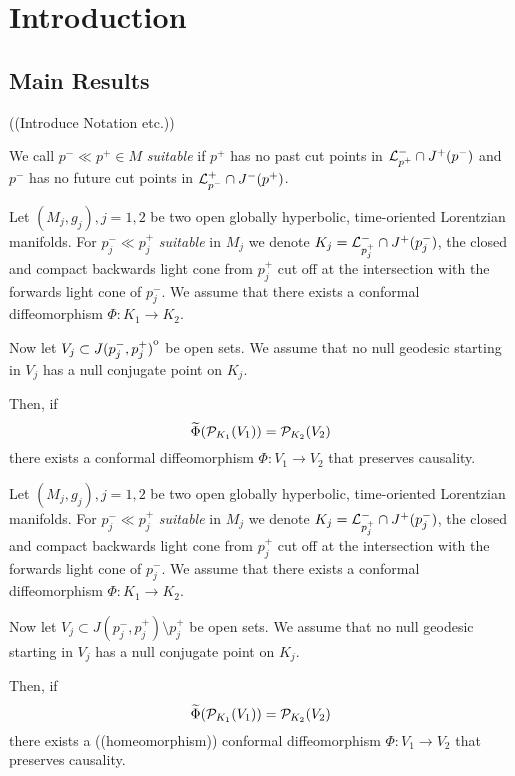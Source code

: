 \chapter{Introduction}

\section{Main Results}
((Introduce Notation etc.))

\begin{definition}[Suitable]
    We call $p^-\ll p^+\in M$ \emph{suitable} if $p^+$ has no past cut points in ${\mathcal{L}}^-_{p^+}\cap J^+(p^-)$ and $p^-$ has no future cut points in ${\mathcal{L}}^+_{p^-}\cap J^-(p^+)$.
\end{definition}

\begin{theorem}\label{thm:intreconstr}
    Let $(M_j,g_j), j=1,2$ be two open globally hyperbolic, time-oriented Lorentzian manifolds. For $p_j^-\ll p_j^+$ \emph{suitable} in $M_j$ we denote $K_j = {\mathcal{L}}^-_{p_j^+} \cap J^+(p_j^-)$, the closed and compact backwards light cone from $p_j^+$ cut off at the intersection with the forwards light cone of $p_j^-$. We assume that there exists a conformal diffeomorphism $\Phi:K_1\to K_2$. 
    
    Now let $V_j\subset{\kern0ptJ(p_j^-,p_j^+)}^{\mathrm{o}}$ be open sets. We assume that no null geodesic starting in $V_j$ has a null conjugate point on $K_j$. 
    
    Then, if 
    \[
    \widetilde{\Phi}({\mathcal{P}}_{K_1}(V_1)) = {\mathcal{P}}_{K_2}(V_2)
    \]
    there exists a conformal diffeomorphism $\Phi:V_1\to V_2$ that preserves causality.
\end{theorem}


\begin{theorem}\label{thm:bdreconstr}
    Let $(M_j,g_j), j=1,2$ be two open globally hyperbolic, time-oriented Lorentzian manifolds. For $p_j^-\ll p_j^+$ \emph{suitable} in $M_j$ we denote $K_j = {\mathcal{L}}^-_{p_j^+} \cap J^+(p_j^-)$, the closed and compact backwards light cone from $p_j^+$ cut off at the intersection with the forwards light cone of $p_j^-$. We assume that there exists a conformal diffeomorphism $\Phi:K_1\to K_2$. 
    
    Now let $V_j\subset J(p_j^-,p_j^+) \setminus p_j^+$ be open sets. We assume that no null geodesic starting in $V_j$ has a null conjugate point on $K_j$. 
    
    Then, if 
    \[
    \widetilde{\Phi}({\mathcal{P}}_{K_1}(V_1)) = {\mathcal{P}}_{K_2}(V_2)
    \]
    there exists a ((homeomorphism)) conformal diffeomorphism $\Phi:V_1\to V_2$ that preserves causality.
\end{theorem}